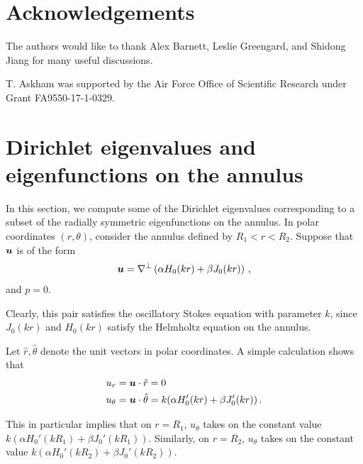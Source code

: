 
%
\section{Acknowledgements}
The authors would like to thank Alex Barnett, Leslie Greengard, and Shidong Jiang
for many useful discussions.

T. Askham was supported by the Air Force Office of Scientific Research 
under Grant FA9550-17-1-0329.


%

\appendix

\section{Dirichlet eigenvalues and eigenfunctions on the annulus \label{sec:annul_dir_exact}}
In this section, we compute some of the Dirichlet eigenvalues
corresponding to a subset of the radially symmetric eigenfunctions
on the annulus. 
In polar coordinates $(r,\theta)$, consider the annulus defined by 
$R_{1}<r<R_{2}$. 
Suppose that ${\boldsymbol u}$ is of the form 
\begin{equation}
{\boldsymbol u} = \nabla^{\perp}\left( \alpha H_{0}(kr) + \beta J_{0}(kr) \right) \, ,
\label{eq:annulus_direig}
\end{equation}
and $p=0$.

Clearly, this pair satisfies the oscillatory Stokes equation
with parameter $k$, since $J_{0}(kr)$ and $H_{0}(kr)$ 
satisfy the Helmholtz equation on the annulus.

Let $\hat{r},\hat{\theta}$ denote the unit vectors in polar coordinates.
A simple calculation shows that 
\begin{equation}
\begin{aligned}
u_{r} &= {\boldsymbol u} \cdot \hat{r}  = 0 \, \\
u_{\theta} &= {\boldsymbol u} \cdot \hat{\theta} = k(\alpha  H_{0}'(kr) + \beta J_{0}'(kr)) \, .
\end{aligned}
\end{equation}

This in particular implies that on $r=R_{1}$,
$u_{\theta}$ takes on the constant value
$k(\alpha H_{0}'(kR_{1}) + \beta J_{0}'(kR_{1}))$.
Similarly, on $r=R_{2}$, 
$u_{\theta}$ takes on the constant value
$k(\alpha H_{0}'(kR_{2}) + \beta J_{0}'(kR_{2}))$.

